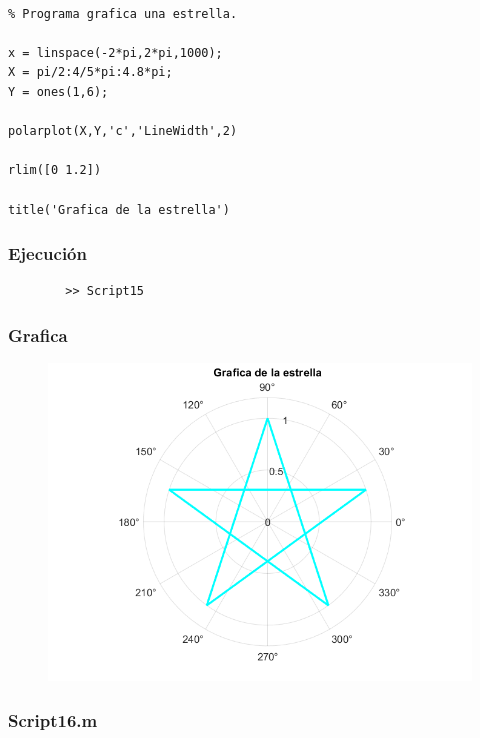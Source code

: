 \documentclass{article}
\begin{document}
	\begin{lstlisting}

% Programa grafica una estrella.

x = linspace(-2*pi,2*pi,1000);
X = pi/2:4/5*pi:4.8*pi;
Y = ones(1,6);

polarplot(X,Y,'c','LineWidth',2)

rlim([0 1.2])

title('Grafica de la estrella')
	\end{lstlisting}
	
	\subsubsection{Ejecución}
	
	\begin{lstlisting}
		>> Script15
	\end{lstlisting}
	
	\subsubsection{Grafica}
	
	\begin{figure}[h]
		\centering
		\includegraphics[width=\textwidth]{grafica15.png}
	\end{figure}
	
	\newpage
	
	\subsubsection{Script16.m}
	
\end{document}
